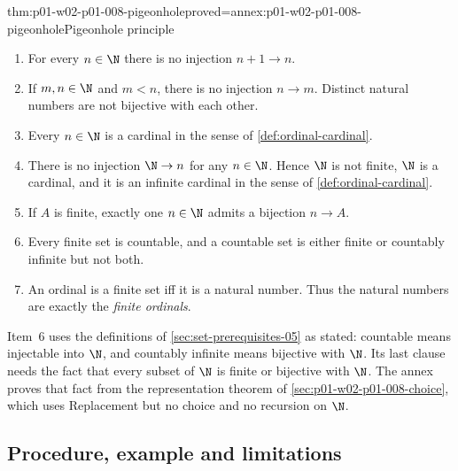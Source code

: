 \begin{hbtheorem}{thm:p01-w02-p01-008-pigeonhole}{proved=annex:p01-w02-p01-008-pigeonhole}{Pigeonhole principle}
\begin{enumerate}
  \item For every \(n\in\N\) there is no injection \(n+1\to n\).
  \item If \(m,n\in\N\) and \(m<n\), there is no injection \(n\to m\).
        Distinct natural numbers are not bijective with each other.
  \item Every \(n\in\N\) is a cardinal in the sense of
        \cref{def:ordinal-cardinal}.
  \item There is no injection \(\N\to n\) for any \(n\in\N\). Hence \(\N\)
        is not finite, \(\N\) is a cardinal, and it is an infinite cardinal
        in the sense of \cref{def:ordinal-cardinal}.
  \item If \(A\) is finite, exactly one \(n\in\N\) admits a bijection
        \(n\to A\).
  \item Every finite set is countable, and a countable set is either finite
        or countably infinite but not both.
  \item An ordinal is a finite set iff it is a natural number. Thus the
        natural numbers are exactly the \emph{finite ordinals}.
\end{enumerate}
\end{hbtheorem}

Item~6 uses the definitions of \cref{sec:set-prerequisites-05} as stated:
countable means injectable into \(\N\), and countably infinite means
bijective with \(\N\). Its last clause needs the fact that every subset of
\(\N\) is finite or bijective with \(\N\). The annex proves that fact from
the representation theorem of \cref{sec:p01-w02-p01-008-choice}, which uses
Replacement but no choice and no recursion on \(\N\).

\subsection{Procedure, example and limitations}
\label{sec:p01-w02-p01-008-naturals-use}

